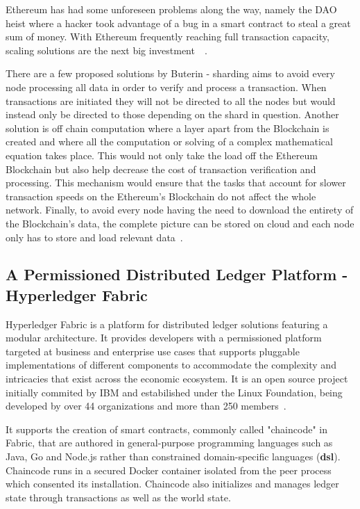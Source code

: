 Ethereum has had some unforeseen problems along the way, namely the DAO heist
where a hacker took advantage of a bug in a smart contract to steal a great sum
of money. With Ethereum frequently reaching full transaction capacity, scaling
solutions are the next big investment~~\cite{ethereumScalability2018}.

There are a few proposed solutions by Buterin - sharding aims to avoid every
node processing all data in order to verify and process a transaction. When
transactions are initiated they will not be directed to all the nodes but would
instead only be directed to those depending on the shard in question.  Another
solution is off chain computation where a layer apart from the Blockchain is
created and where all the computation or solving of a complex mathematical
equation takes place. This would not only take the load off the Ethereum
Blockchain but also help decrease the cost of transaction verification and
processing. This mechanism would ensure that the tasks that account for slower
transaction speeds on the Ethereum’s Blockchain do not affect the whole
network. Finally, to avoid every node having the need to download the entirety
of the Blockchain's data, the complete picture can be stored on cloud and each
node only has to store and load relevant
data~\cite{ethereumBlogScalability2018}.

\subsection{A Permissioned Distributed Ledger Platform - Hyperledger Fabric}

Hyperledger Fabric is a platform for distributed ledger solutions featuring a
modular architecture. It provides developers with a permissioned platform
targeted at business and enterprise use cases that supports pluggable
implementations of different components to accommodate the complexity and
intricacies that exist across the economic ecosystem. It is an open source
project initially commited by IBM  and estabilished under the Linux Foundation,
being developed by over 44 organizations and more than 250
members~\cite{HyperledgerFabricDocs2017,HyperledgerGrowth2018}.

It supports the creation of smart contracts, commonly called "chaincode" in
Fabric, that are authored in general-purpose programming languages such as
Java, Go and Node.js rather than constrained domain-specific languages
(\textbf{dsl}). Chaincode runs in a secured Docker container isolated from the
peer process which consented its installation. Chaincode also initializes and
manages ledger state through transactions as well as the world state.

